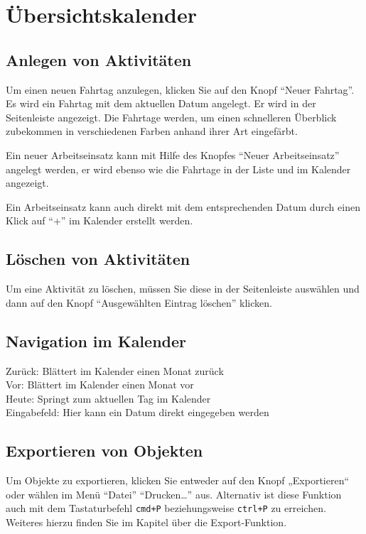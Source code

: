 \chapter{Übersichtskalender}
\section{Anlegen von Aktivitäten}
Um einen neuen Fahrtag anzulegen, klicken Sie auf den Knopf ``Neuer Fahrtag''.
Es wird ein Fahrtag mit dem aktuellen Datum angelegt.
Er wird in der Seitenleiste angezeigt.
Die Fahrtage werden, um einen schnelleren Überblick zubekommen in verschiedenen Farben anhand ihrer Art eingefärbt.

Ein neuer Arbeitseinsatz kann mit Hilfe des Knopfes ``Neuer Arbeitseinsatz'' angelegt werden, er wird ebenso wie die Fahrtage in der Liste und im Kalender angezeigt.

Ein Arbeitseinsatz kann auch direkt mit dem entsprechenden Datum durch einen Klick auf ``+'' im Kalender erstellt werden.


\section{Löschen von Aktivitäten}
Um eine Aktivität zu löschen, müssen Sie diese in der Seitenleiste auswählen und dann auf den Knopf ``Ausgewählten Eintrag löschen'' klicken.



\section{Navigation im Kalender}
Zurück: Blättert im Kalender einen Monat zurück\\
Vor:		Blättert im Kalender einen Monat vor \\
Heute:	Springt zum aktuellen Tag im Kalender \\
Eingabefeld:	Hier kann ein Datum direkt eingegeben werden


\section{Exportieren von Objekten}
Um Objekte zu exportieren, klicken Sie entweder auf den Knopf „Exportieren“ oder wählen im Menü ``Datei'' \nach ``Drucken\dots'' aus.
Alternativ ist diese Funktion auch mit dem Tastaturbefehl \texttt{cmd+P} beziehungsweise \texttt{ctrl+P} zu erreichen.
Weiteres hierzu finden Sie im Kapitel über die Export-Funktion.



